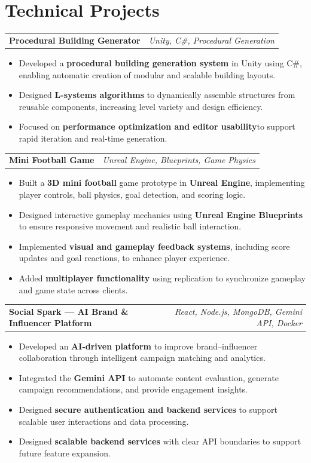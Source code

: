 \documentclass[9pt]{extarticle}
\makeatletter
\newcommand{\row}[2]{%
	\begin{tabular*}{\textwidth}{@{}l@{\extracolsep{\fill}}r@{}}%
		#1 & #2 \\
	\end{tabular*}%
}
\newcommand{\tightitemize}{\begin{itemize}}
\newcommand{\afterlist}{\vspace{2pt}}
\makeatother
\begin{document}
		\section{Technical Projects}
		\row{\textbf{Procedural Building Generator}}{\textit{Unity, C\#, Procedural Generation}}
		\tightitemize
			\item Developed a \textbf{procedural building generation system} in Unity using C\#, enabling automatic creation of modular and scalable building layouts.
			\item Designed \textbf{L-systems algorithms} to dynamically assemble structures from reusable components, increasing level variety and design efficiency.
			\item Focused on \textbf{performance optimization and editor usability}to support rapid iteration and real-time generation.
		\end{itemize}
		\afterlist
	
		\row{\textbf{Mini Football Game}}{\textit{Unreal Engine, Blueprints, Game Physics}}
		\tightitemize
			\item Built a \textbf{3D mini football} game prototype in \textbf{Unreal Engine}, implementing player controls, ball physics, goal detection, and scoring logic.
			\item Designed interactive gameplay mechanics using \textbf{Unreal Engine Blueprints} to ensure responsive movement and realistic ball interaction.
			\item Implemented \textbf{visual and gameplay feedback systems}, including score updates and goal reactions, to enhance player experience.
			\item Added \textbf{multiplayer functionality} using replication to synchronize gameplay and game state across clients.
		\end{itemize}
		
		\row{\textbf{Social Spark — AI Brand \& Influencer Platform}}{\textit{React, Node.js, MongoDB, Gemini API, Docker}}
		\tightitemize
		\item Developed an \textbf{AI-driven platform} to improve brand--influencer collaboration through intelligent campaign matching and analytics.
		\item Integrated the \textbf{Gemini API} to automate content evaluation, generate campaign recommendations, and provide engagement insights.
		\item Designed \textbf{ secure authentication and backend services} to support scalable user interactions and data processing.
		\item Designed \textbf{scalable backend services} with clear API boundaries to support future feature expansion.
		\end{itemize}
		\afterlist
\end{document}
